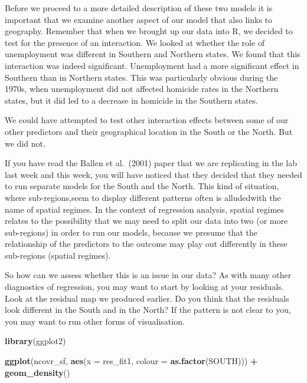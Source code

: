 \documentclass[]{book}
\newenvironment{Shaded}{\begin{snugshade}}{\end{snugshade}}
\newcommand{\DataTypeTok}[1]{\textcolor[rgb]{0.13,0.29,0.53}{#1}}
\newcommand{\KeywordTok}[1]{\textcolor[rgb]{0.13,0.29,0.53}{\textbf{#1}}}
\newcommand{\NormalTok}[1]{#1}
\newcommand{\OperatorTok}[1]{\textcolor[rgb]{0.81,0.36,0.00}{\textbf{#1}}}
\newcommand{\StringTok}[1]{\textcolor[rgb]{0.31,0.60,0.02}{#1}}
\begin{document}
Before we proceed to a more detailed description of these two models it is important that we examine another aspect of our model that also links to geography. Remember that when we brought up our data into R, we decided to test for the presence of an interaction. We looked at whether the role of unemployment was different in Southern and Northern states. We found that this interaction was indeed significant. Unemployment had a more significant effect in Southern than in Northern states. This was particularly obvious during the 1970s, when unemployment did not affected homicide rates in the Northern states, but it did led to a decrease in homicide in the Southern states.

We could have attempted to test other interaction effects between some of our other predictors and their geographical location in the South or the North. But we did not.

If you have read the Ballen et al.~(2001) paper that we are replicating in the lab last week and this week, you will have noticed that they decided that they needed to run separate models for the South and the North. This kind of situation, where sub-regions,seem to display different patterns often is alludedwith the name of spatial regimes. In the context of regression analysis, spatial regimes relates to the possibility that we may need to split our data into two (or more sub-regions) in order to run our models, because we presume that the relationship of the predictors to the outcome may play out differently in these sub-regions (spatial regimes).

So how can we assess whether this is an issue in our data? As with many other diagnostics of regression, you may want to start by looking at your residuals. Look at the residual map we produced earlier. Do you think that the residuals look different in the South and in the North? If the pattern is not clear to you, you may want to run other forms of visualisation.

\begin{Shaded}
\begin{Highlighting}[]
\KeywordTok{library}\NormalTok{(ggplot2)}

\KeywordTok{ggplot}\NormalTok{(ncovr_sf, }\KeywordTok{aes}\NormalTok{(}\DataTypeTok{x =}\NormalTok{ res_fit1, }\DataTypeTok{colour =} \KeywordTok{as.factor}\NormalTok{(SOUTH))) }\OperatorTok{+}\StringTok{ }
\StringTok{  }\KeywordTok{geom_density}\NormalTok{() }
\end{Highlighting}
\end{Shaded}
\end{document}
